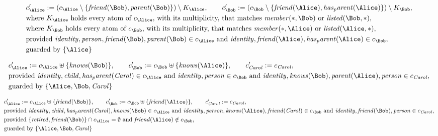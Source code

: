 \begin{align*}
&
c'_
{
\Alice
}
 := 
(c_
{
\Alice
}
 \setminus 
\{
\mathit{
friend
}
(
\Bob
)
,
\mathit{
parent
}
(
\Bob
)
\}
) \setminus K_
{
\Alice
}
, \qquad 
c'_
{
\Bob
}
 := 
(c_
{
\Bob
}
 \setminus 
\{
\mathit{
friend
}
(
\Alice
)
,
\mathit{
has_parent
}
(
\Alice
)
\}
) \setminus K_
{
\Bob
}
,\\
&
\text{where } K_
{
\Alice
}
 \text{ holds every atom of } c_
{
\Alice
}
 \text{, with its multiplicity, that matches } 
\mathit{
member
}
(
\ast
,
\Bob
)
 \text{ or } 
\mathit{
listed
}
(
\Bob
,
\ast
)
,\\
&
\text{where } K_
{
\Bob
}
 \text{ holds every atom of } c_
{
\Bob
}
 \text{, with its multiplicity, that matches } 
\mathit{
member
}
(
\ast
,
\Alice
)
 \text{ or } 
\mathit{
listed
}
(
\Alice
,
\ast
)
,\\
&
\text{provided } 
\mathit{
identity
}
,
\mathit{
person
}
,
\mathit{
friend
}
(
\Bob
)
,
\mathit{
parent
}
(
\Bob
)
 \in c_
{
\Alice
}
 \text{ and } 
\mathit{
identity
}
,
\mathit{
friend
}
(
\Alice
)
,
\mathit{
has_parent
}
(
\Alice
)
 \in c_
{
\Bob
}
,\\
&
\text{guarded by } \{
\Alice
\}
\end{align*}

\begin{align*}
&
c'_
{
\Alice
}
 := 
c_
{
\Alice
}
 \uplus 
\{
\mathit{
knows
}
(
\Bob
)
\}
, \qquad 
c'_
{
\Bob
}
 := 
c_
{
\Bob
}
 \uplus 
\{
\mathit{
knows
}
(
\Alice
)
\}
, \qquad 
c'_
{
\mathit{Carol}
}
 := 
c_
{
\mathit{Carol}
}
,\\
&
\text{provided } 
\mathit{
identity
}
,
\mathit{
child
}
,
\mathit{
has_parent
}
(
\mathit{Carol}
)
 \in c_
{
\Alice
}
 \text{ and } 
\mathit{
identity
}
,
\mathit{
person
}
 \in c_
{
\Bob
}
 \text{ and } 
\mathit{
identity
}
,
\mathit{
knows
}
(
\Bob
)
,
\mathit{
parent
}
(
\Alice
)
,
\mathit{
person
}
 \in c_
{
\mathit{Carol}
}
,\\
&
\text{guarded by } \{
\Alice
,
\Bob
,
\mathit{Carol}
\}
\end{align*}

\begin{align*}
&
c'_
{
\Alice
}
 := 
c_
{
\Alice
}
 \uplus 
\{
\mathit{
friend
}
(
\Bob
)
\}
, \qquad 
c'_
{
\Bob
}
 := 
c_
{
\Bob
}
 \uplus 
\{
\mathit{
friend
}
(
\Alice
)
\}
, \qquad 
c'_
{
\mathit{Carol}
}
 := 
c_
{
\mathit{Carol}
}
,\\
&
\text{provided } 
\mathit{
identity
}
,
\mathit{
child
}
,
\mathit{
has_parent
}
(
\mathit{Carol}
)
,
\mathit{
knows
}
(
\Bob
)
 \in c_
{
\Alice
}
 \text{ and } 
\mathit{
identity
}
,
\mathit{
person
}
,
\mathit{
knows
}
(
\Alice
)
,
\mathit{
friend
}
(
\mathit{Carol}
)
 \in c_
{
\Bob
}
 \text{ and } 
\mathit{
identity
}
,
\mathit{
friend
}
(
\Bob
)
,
\mathit{
person
}
 \in c_
{
\mathit{Carol}
}
,\\
&
\text{provided } 
\{
\mathit{
retired
}
,
\mathit{
friend
}
(
\Bob
)
\}
 \cap c_
{
\Alice
}
 = \emptyset
 \text{ and } 
\mathit{
friend
}
(
\Alice
)
 \notin c_
{
\Bob
}
,\\
&
\text{guarded by } \{
\Alice
,
\Bob
,
\mathit{Carol}
\}
\end{align*}
